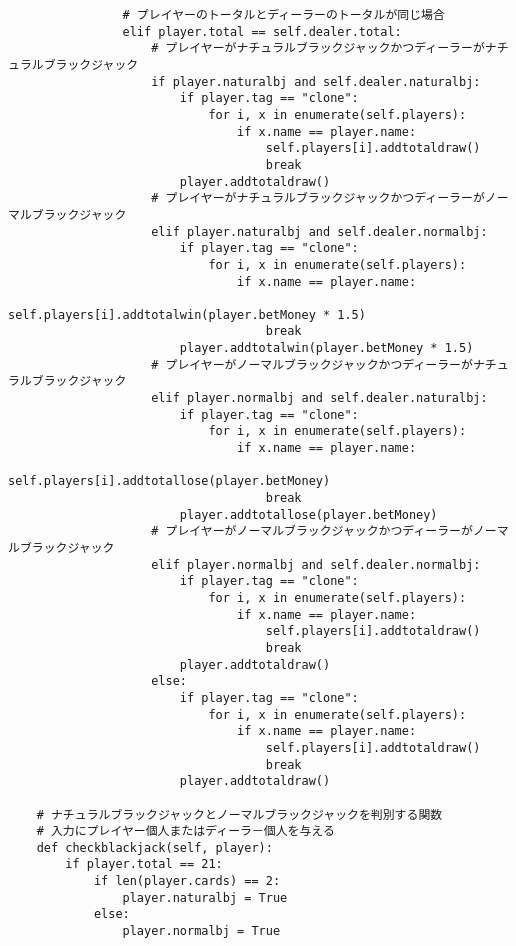 \begin{itemize}
\begin{lstlisting}
                # プレイヤーのトータルとディーラーのトータルが同じ場合
                elif player.total == self.dealer.total:
                    # プレイヤーがナチュラルブラックジャックかつディーラーがナチュラルブラックジャック
                    if player.naturalbj and self.dealer.naturalbj:
                        if player.tag == "clone":
                            for i, x in enumerate(self.players):
                                if x.name == player.name:
                                    self.players[i].addtotaldraw()
                                    break
                        player.addtotaldraw()
                    # プレイヤーがナチュラルブラックジャックかつディーラーがノーマルブラックジャック
                    elif player.naturalbj and self.dealer.normalbj:
                        if player.tag == "clone":
                            for i, x in enumerate(self.players):
                                if x.name == player.name:
                                    self.players[i].addtotalwin(player.betMoney * 1.5)
                                    break
                        player.addtotalwin(player.betMoney * 1.5)
                    # プレイヤーがノーマルブラックジャックかつディーラーがナチュラルブラックジャック
                    elif player.normalbj and self.dealer.naturalbj:
                        if player.tag == "clone":
                            for i, x in enumerate(self.players):
                                if x.name == player.name:
                                    self.players[i].addtotallose(player.betMoney)
                                    break
                        player.addtotallose(player.betMoney)
                    # プレイヤーがノーマルブラックジャックかつディーラーがノーマルブラックジャック
                    elif player.normalbj and self.dealer.normalbj:
                        if player.tag == "clone":
                            for i, x in enumerate(self.players):
                                if x.name == player.name:
                                    self.players[i].addtotaldraw()
                                    break
                        player.addtotaldraw()
                    else:
                        if player.tag == "clone":
                            for i, x in enumerate(self.players):
                                if x.name == player.name:
                                    self.players[i].addtotaldraw()
                                    break
                        player.addtotaldraw()

    # ナチュラルブラックジャックとノーマルブラックジャックを判別する関数
    # 入力にプレイヤー個人またはディーラ－個人を与える
    def checkblackjack(self, player):
        if player.total == 21:
            if len(player.cards) == 2:
                player.naturalbj = True
            else:
                player.normalbj = True

\end{lstlisting}
\end{itemize}
\newpage
